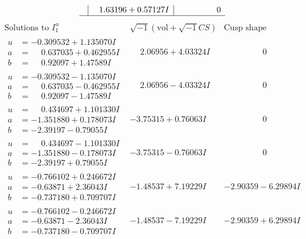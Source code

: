 \documentclass[1p]{elsarticle_modified}
\theoremstyle{definition}
\newcommand{\I}{\sqrt{-1}}
\begin{document}
$$\begin{array}{c|c|c}
 & \phantom{-}1.63196 + 0.57127 I & \phantom{-0.000000 } 0\\
 \hline 
 \end{array}$$\newpage$$\begin{array}{c|c|c}  
\text{Solutions to }I^u_{1}& \I (\text{vol} + \sqrt{-1}CS) & \text{Cusp shape}\\
 \hline 
\begin{aligned}
u &= -0.309532 + 1.135070 I \\
a &= \phantom{-}0.637035 + 0.462955 I \\
b &= \phantom{-}0.92097 + 1.47589 I\end{aligned}
 & \phantom{-}2.06956 + 4.03324 I & \phantom{-0.000000 } 0 \\ \hline\begin{aligned}
u &= -0.309532 - 1.135070 I \\
a &= \phantom{-}0.637035 - 0.462955 I \\
b &= \phantom{-}0.92097 - 1.47589 I\end{aligned}
 & \phantom{-}2.06956 - 4.03324 I & \phantom{-0.000000 } 0 \\ \hline\begin{aligned}
u &= \phantom{-}0.434697 + 1.101330 I \\
a &= -1.351880 + 0.178073 I \\
b &= -2.39197 - 0.79055 I\end{aligned}
 & -3.75315 + 0.76063 I & \phantom{-0.000000 } 0 \\ \hline\begin{aligned}
u &= \phantom{-}0.434697 - 1.101330 I \\
a &= -1.351880 - 0.178073 I \\
b &= -2.39197 + 0.79055 I\end{aligned}
 & -3.75315 - 0.76063 I & \phantom{-0.000000 } 0 \\ \hline\begin{aligned}
u &= -0.766102 + 0.246672 I \\
a &= -0.63871 + 2.36043 I \\
b &= -0.737180 + 0.709707 I\end{aligned}
 & -1.48537 + 7.19229 I & -2.90359 - 6.29894 I \\ \hline\begin{aligned}
u &= -0.766102 - 0.246672 I \\
a &= -0.63871 - 2.36043 I \\
b &= -0.737180 - 0.709707 I\end{aligned}
 & -1.48537 - 7.19229 I & -2.90359 + 6.29894 I \\ \hline\begin{aligned}

\end{aligned}
\end{array}$$
\end{document}
